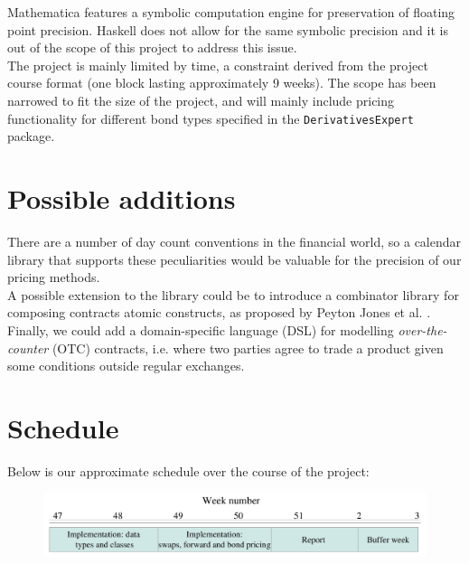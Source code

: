 \documentclass[11pt]{article}
\newcommand{\comm}[2]{{\sf \(\spadesuit\){\bf #1: }{\rm \sf #2}\(\spadesuit\)}}
\newcommand{\mcomm}[2]{\marginpar{\scriptsize \comm{#1}{#2}}}
\newcommand{\ab}[1]{\mcomm{AB}{#1}}
\begin{document}
Mathematica features a symbolic computation engine for preservation of floating point precision. Haskell
does not allow for the same symbolic precision and it is out of the scope of this project to address this issue.\\

The project is mainly limited by time, a constraint derived from the project course 
format (one block lasting approximately 9 weeks).
The scope has been narrowed to fit the size of the project, and will mainly include
pricing functionality for different bond types specified in the {\tt DerivativesExpert} package.

\section*{Possible additions}

There are a number of day count conventions in the financial world, so a
calendar library that supports these peculiarities would be valuable for the precision
of our pricing methods.\\



A possible extension to the library could be to introduce a combinator library for composing contracts
atomic constructs, as proposed by Peyton Jones et al. \cite{composingcontracts}.\\

Finally, we could add a domain-specific language (DSL) for modelling \emph{over-the-counter}
(OTC) contracts, i.e. where two parties agree to trade a product given some conditions
outside regular exchanges.

\section*{Schedule}


Below is our approximate schedule over the course of the project:

\begin{figure}[h!]
\begin{center}
\includegraphics[bb = 0 0 1302 348, scale=0.275]{schedule.png}
\end{center}
\end{figure}



\end{document}
